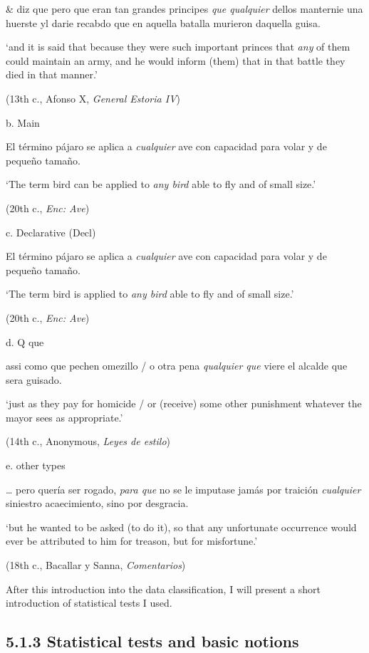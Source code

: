     \& diz que pero que eran tan grandes principes \textit{que qualquier} dellos manternie una huerste yl darie recabdo que en aquella batalla murieron daquella guisa. 

    ‘and it is said that because they were such important princes that \textit{any} of them could maintain an army, and he would inform (them) that in that battle they died in that manner.’

    (13th c., Afonso X, \textit{General Estoria IV})

  b.  Main

    El término pájaro se aplica a \textit{cualquier} ave con capacidad para volar y de pequeño tamaño. 

    ‘The term bird can be applied to \textit{any bird} able to fly and of small size.’

    (20th c., \textit{Enc: Ave})

  c.  Declarative (Decl)

    El término pájaro se aplica a \textit{cualquier} ave con capacidad para volar y de pequeño tamaño. 

    ‘The term bird is applied to \textit{any bird} able to fly and of small size.’

    (20th c., \textit{Enc: Ave})

  d.  Q que

    assi como que pechen omezillo / o otra pena \textit{qualquier que} viere el alcalde que sera guisado. 

    ‘just as they pay for homicide / or (receive) some other punishment whatever the mayor sees as appropriate.’

    (14th c., Anonymous, \textit{Leyes de estilo})

  e.  other types

    … pero quería ser rogado, \textit{para que} no se le imputase jamás por traición \textit{cualquier} siniestro acaecimiento, sino por desgracia. 

    ‘but he wanted to be asked (to do it), so that any unfortunate occurrence would ever be attributed to him for treason, but for misfortune.’

    (18th c., Bacallar y Sanna, \textit{Comentarios})

After this introduction into the data classification, I will present a short introduction of statistical tests I used.

\subsection{\textbf{5.1.3} \textbf{Statistical} \textbf{tests} \textbf{and} \textbf{basic} \textbf{notions}}

